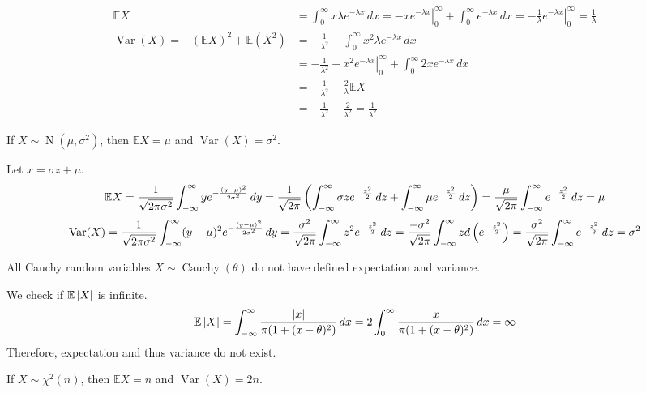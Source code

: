\documentclass{huhtakm-template-book}
\newcommand{\expect}{\mathbb{E}}
\DeclareMathOperator{\N}{N}
\DeclareMathOperator{\Cauchy}{Cauchy}
\DeclareMathOperator{\Var}{Var}
\begin{document}
\begin{proofing}
	\begin{align*}
		\expect{X}&=\int_{0}^{\infty}x\lambda e^{-\lambda x}\,dx=\left.-xe^{-\lambda x}\right|_{0}^{\infty}+\int_{0}^{\infty}e^{-\lambda x}\,dx=\left.-\frac{1}{\lambda}e^{-\lambda x}\right|_{0}^{\infty}=\frac{1}{\lambda}\\
		\Var(X)=-(\expect{X})^{2}+\expect(X^{2})&=-\frac{1}{\lambda^{2}}+\int_{0}^{\infty}x^{2}\lambda e^{-\lambda x}\,dx\\
		&=-\frac{1}{\lambda^{2}}-\left.x^{2}e^{-\lambda x}\right|_{0}^{\infty}+\int_{0}^{\infty}2xe^{-\lambda x}\,dx\\
		&=-\frac{1}{\lambda^{2}}+\frac{2}{\lambda}\expect{X}\\
		&=-\frac{1}{\lambda^{2}}+\frac{2}{\lambda^{2}}=\frac{1}{\lambda^{2}}
	\end{align*}
\end{proofing}
\begin{thm}
	\label{Chapter 6 (Theorem) Expectation and Variance of normal distribution}
	If $X\sim\N(\mu,\sigma^{2})$, then $\expect{X}=\mu$ and $\Var(X)=\sigma^{2}$.
\end{thm}
\begin{proofing}
	\item Let $x=\sigma z+\mu$.
	\begin{equation*}
		\expect{X}=\frac{1}{\sqrt{2\pi\sigma^{2}}}\intinfty ye^{-\frac{(y-\mu)^{2}}{2\sigma^{2}}}\,dy=\frac{1}{\sqrt{2\pi}}\left(\intinfty\sigma ze^{-\frac{z^{2}}{2}}\,dz+\intinfty\mu e^{-\frac{z^{2}}{2}}\,dz\right)=\frac{\mu}{\sqrt{2\pi}}\intinfty e^{-\frac{z^{2}}{2}}\,dz=\mu
	\end{equation*}
	\begin{equation*}
		\Var(X)=\frac{1}{\sqrt{2\pi\sigma^{2}}}\intinfty(y-\mu)^{2}e^{-\frac{(y-\mu)^{2}}{2\sigma^{2}}}\,dy=\frac{\sigma^{2}}{\sqrt{2\pi}}\intinfty z^{2}e^{-\frac{z^{2}}{2}}\,dz=\frac{-\sigma^{2}}{\sqrt{2\pi}}\intinfty zd\left(e^{-\frac{z^{2}}{2}}\right)=\frac{\sigma^{2}}{\sqrt{2\pi}}\intinfty e^{-\frac{z^{2}}{2}}\,dz=\sigma^{2}
	\end{equation*}
\end{proofing}
\begin{thm}
	All Cauchy random variables $X\sim\Cauchy(\theta)$ do not have defined expectation and variance.
\end{thm}
\begin{proofing}
	We check if $\expect\abs{X}$ is infinite.
	\begin{equation*}
		\expect\abs{X}=\intinfty\frac{\abs{x}}{\pi(1+(x-\theta)^{2})}\,dx=2\int_{0}^{\infty}\frac{x}{\pi(1+(x-\theta)^{2})}\,dx=\infty
	\end{equation*}
	Therefore, expectation and thus variance do not exist.
\end{proofing}
\begin{thm}
	If $X\sim\chi^{2}(n)$, then $\expect{X}=n$ and $\Var(X)=2n$.
\end{thm}
\end{document}
